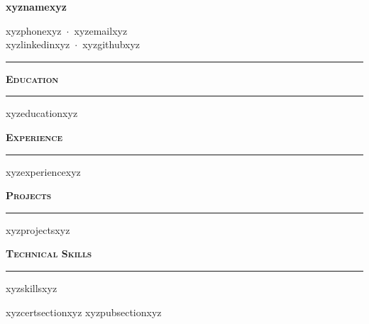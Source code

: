 \documentclass[10.5pt,letterpaper]{article}
\newcommand{\resumesection}[1]{%
  \vspace{6pt}%
  {\textbf{\small\scshape #1}}\\[-4pt]%
  \textcolor{accent}{\rule{\linewidth}{1.2pt}}%
  \vspace{2pt}%
}
\begin{document}
\begin{minipage}[t]{0.55\linewidth}
  {\large\bfseries xyznamexyz}
\end{minipage}%
\begin{minipage}[t]{0.45\linewidth}
  \raggedleft
  \small
  xyzphonexyz\ $\cdot$\ xyzemailxyz\\
  xyzlinkedinxyz\ $\cdot$\ xyzgithubxyz
\end{minipage}

\vspace{2pt}
\textcolor{accent}{\rule{\linewidth}{0.6pt}}
\vspace{2pt}

\resumesection{Education}
xyzeducationxyz

\resumesection{Experience}
xyzexperiencexyz

\resumesection{Projects}
xyzprojectsxyz

\resumesection{Technical Skills}
\begin{itemize}[leftmargin=1.5em,itemsep=1pt,topsep=2pt]
xyzskillsxyz
\end{itemize}

xyzcertsectionxyz
xyzpubsectionxyz
\end{document}
